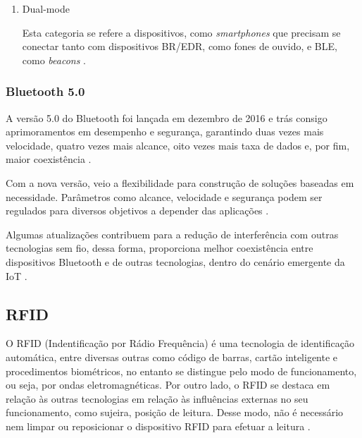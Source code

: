 \begin{enumerate}[label=(\Alph*)]
    
    \item{Dual-mode}
    
    Esta categoria se refere a dispositivos, como \textit{smartphones} que precisam se conectar tanto com dispositivos BR/EDR, como fones de ouvido, e BLE, como \textit{beacons} \cite{BluetoothSIG2017a}.

\end{enumerate}


\subsubsection{Bluetooth 5.0}

A versão 5.0 do Bluetooth foi lançada em dezembro de 2016 e trás consigo aprimoramentos em desempenho e segurança, garantindo duas vezes mais velocidade, quatro vezes mais alcance, oito vezes mais taxa de dados e, por fim, maior coexistência \cite{BluetoothSIG2017b}. 

Com a nova versão, veio a flexibilidade para construção de soluções baseadas em necessidade. Parâmetros como alcance, velocidade e segurança podem ser regulados para diversos objetivos a depender das aplicações \cite{BluetoothSIG2017b}.

Algumas atualizações contribuem para a redução de interferência com outras tecnologias sem fio, dessa forma, proporciona melhor coexistência entre dispositivos Bluetooth e de outras tecnologias, dentro do cenário emergente da IoT \cite{BluetoothSIG2017b}.


\subsection{RFID}

O RFID (Indentificação por Rádio Frequência) é uma tecnologia de identificação automática, entre diversas outras como código de barras, cartão inteligente e procedimentos biométricos, no entanto se distingue pelo modo de funcionamento, ou seja, por ondas eletromagnéticas. Por outro lado, o RFID se destaca em relação às outras tecnologias em relação às influências externas no seu funcionamento, como sujeira, posição de leitura. Desse modo, não é necessário nem limpar ou reposicionar o dispositivo RFID para efetuar a leitura \cite{Finkenzeller2010}. 

